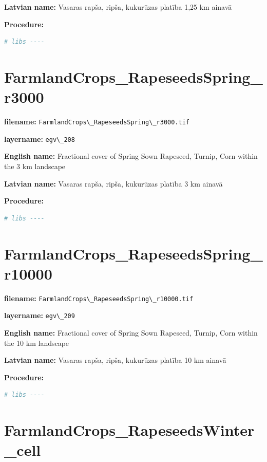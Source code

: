 \documentclass[
]{book}
\newcommand{\passthrough}[1]{#1}
\begin{document}
\textbf{Latvian name:} Vasaras rapša, ripša, kukurūzas platība 1,25 km ainavā

\textbf{Procedure:}

\begin{lstlisting}[language=R]
# libs ----
\end{lstlisting}

\section{FarmlandCrops\_RapeseedsSpring\_r3000}\label{ch06.208}

\textbf{filename:} \passthrough{\lstinline!FarmlandCrops\_RapeseedsSpring\_r3000.tif!}

\textbf{layername:} \passthrough{\lstinline!egv\_208!}

\textbf{English name:} Fractional cover of Spring Sown Rapeseed, Turnip, Corn within the 3 km landscape

\textbf{Latvian name:} Vasaras rapša, ripša, kukurūzas platība 3 km ainavā

\textbf{Procedure:}

\begin{lstlisting}[language=R]
# libs ----
\end{lstlisting}

\section{FarmlandCrops\_RapeseedsSpring\_r10000}\label{ch06.209}

\textbf{filename:} \passthrough{\lstinline!FarmlandCrops\_RapeseedsSpring\_r10000.tif!}

\textbf{layername:} \passthrough{\lstinline!egv\_209!}

\textbf{English name:} Fractional cover of Spring Sown Rapeseed, Turnip, Corn within the 10 km landscape

\textbf{Latvian name:} Vasaras rapša, ripša, kukurūzas platība 10 km ainavā

\textbf{Procedure:}

\begin{lstlisting}[language=R]
# libs ----
\end{lstlisting}

\section{FarmlandCrops\_RapeseedsWinter\_cell}\label{ch06.210}
\end{document}
